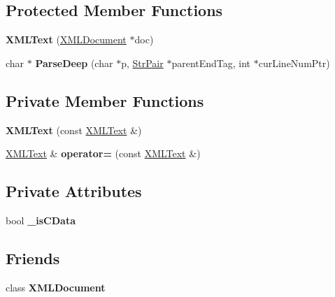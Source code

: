 \subsection*{Protected Member Functions}
\begin{DoxyCompactItemize}
\item 
\mbox{\label{classtinyxml2_1_1XMLText_ad9f46d70e61e5386ead93728d8b90267}} 
{\bfseries X\+M\+L\+Text} (\mbox{\hyperlink{classtinyxml2_1_1XMLDocument}{X\+M\+L\+Document}} $\ast$doc)
\item 
\mbox{\label{classtinyxml2_1_1XMLText_ac895ee9b8a664d94d71b41ba3c28e8a5}} 
char $\ast$ {\bfseries Parse\+Deep} (char $\ast$p, \mbox{\hyperlink{classtinyxml2_1_1StrPair}{Str\+Pair}} $\ast$parent\+End\+Tag, int $\ast$cur\+Line\+Num\+Ptr)
\end{DoxyCompactItemize}
\subsection*{Private Member Functions}
\begin{DoxyCompactItemize}
\item 
\mbox{\label{classtinyxml2_1_1XMLText_a002156e1f61ee6d48e5368b7cca25582}} 
{\bfseries X\+M\+L\+Text} (const \mbox{\hyperlink{classtinyxml2_1_1XMLText}{X\+M\+L\+Text}} \&)
\item 
\mbox{\label{classtinyxml2_1_1XMLText_ad8c9f398d92fa472e213b89d8483ae8f}} 
\mbox{\hyperlink{classtinyxml2_1_1XMLText}{X\+M\+L\+Text}} \& {\bfseries operator=} (const \mbox{\hyperlink{classtinyxml2_1_1XMLText}{X\+M\+L\+Text}} \&)
\end{DoxyCompactItemize}
\subsection*{Private Attributes}
\begin{DoxyCompactItemize}
\item 
\mbox{\label{classtinyxml2_1_1XMLText_aae1a8b4117e8c8bb107900a0560d5ab5}} 
bool {\bfseries \+\_\+is\+C\+Data}
\end{DoxyCompactItemize}
\subsection*{Friends}
\begin{DoxyCompactItemize}
\item 
\mbox{\label{classtinyxml2_1_1XMLText_a4eee3bda60c60a30e4e8cd4ea91c4c6e}} 
class {\bfseries X\+M\+L\+Document}
\end{DoxyCompactItemize}
